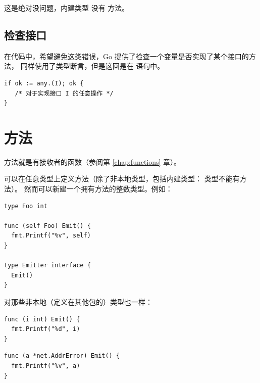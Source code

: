 \noindent{}

\noindent{}这是绝对没问题，内建类型  没有  方法。

\subsection{检查接口}
在代码中，希望避免这类错误，Go 提供了检查一个变量是否实现了某个接口的方法，
同样使用了类型断言，但是这回是在  语句中。

\begin{lstlisting}
if ok := any.(I); ok { 
   /* 对于实现接口 I 的任意操作 */
} 
\end{lstlisting}

\section{方法}
方法就是有接收者的函数（参阅第 \ref{chap:functions} 章）。

可以在任意类型上定义方法（除了非本地类型，包括内建类型： 类型不能有方法）。
然而可以新建一个拥有方法的整数类型。例如：
\begin{lstlisting}
type Foo int

func (self Foo) Emit() {
  fmt.Printf("%v", self)
}

type Emitter interface {
  Emit()
}
\end{lstlisting}
对那些非本地（定义在其他包的）类型也一样：

\begin{minipage}{.5\textwidth}
\begin{lstlisting}[linewidth=.7\textwidth,caption=扩展内建类型错误]
func (i int) Emit() {
  fmt.Printf("%d", i)
}
\end{lstlisting}
\noindent{}
\end{minipage}
\begin{minipage}{.5\textwidth}
\begin{lstlisting}[caption=扩展非本地类型错误]
func (a *net.AddrError) Emit() {
  fmt.Printf("%v", a)
}
\end{lstlisting}
\noindent{}
\end{minipage}

\paragraph{}  %

